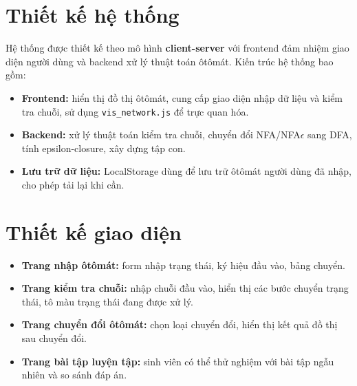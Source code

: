 \documentclass[12pt,a4paper]{report}
\begin{document}
\section{Thiết kế hệ thống}
\hspace*{0.7cm}Hệ thống được thiết kế theo mô hình \textbf{client-server} với frontend đảm nhiệm giao diện người dùng và backend xử lý thuật toán ôtômát. Kiến trúc hệ thống bao gồm:
\begin{itemize}
  \item \textbf{Frontend:} hiển thị đồ thị ôtômát, cung cấp giao diện nhập dữ liệu và kiểm tra chuỗi, sử dụng \texttt{vis\_network.js} để trực quan hóa.
  \item \textbf{Backend:} xử lý thuật toán kiểm tra chuỗi, chuyển đổi NFA/NFA$\epsilon$ sang DFA, tính epsilon-closure, xây dựng tập con.
  \item \textbf{Lưu trữ dữ liệu:} LocalStorage dùng để lưu trữ ôtômát người dùng đã nhập, cho phép tải lại khi cần.
\end{itemize}

\section{Thiết kế giao diện}
\begin{itemize}
  \item \textbf{Trang nhập ôtômát:} form nhập trạng thái, ký hiệu đầu vào, bảng chuyển.
  \item \textbf{Trang kiểm tra chuỗi:} nhập chuỗi đầu vào, hiển thị các bước chuyển trạng thái, tô màu trạng thái đang được xử lý.
  \item \textbf{Trang chuyển đổi ôtômát:} chọn loại chuyển đổi, hiển thị kết quả đồ thị sau chuyển đổi.
  \item \textbf{Trang bài tập luyện tập:} sinh viên có thể thử nghiệm với bài tập ngẫu nhiên và so sánh đáp án.
\end{itemize}
\end{document}
